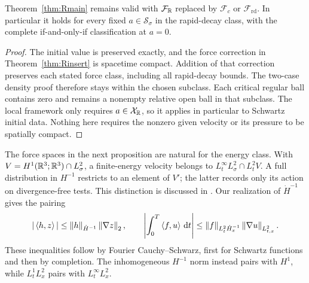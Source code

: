 \begin{corollary}\label{cor:Rclasses}
Theorem~\ref{thm:Rmain} remains valid with $\mathcal F_{\mathbb R}$ replaced by $\mathcal F_c$ or $\mathcal F_{\mathrm{rd}}$. In particular it holds for every fixed $a\in\mathcal S_\sigma$ in the rapid-decay class, with the complete if-and-only-if classification at $a=0$.
\end{corollary}
\begin{proof}
The initial value is preserved exactly, and the force correction in Theorem~\ref{thm:Rinsert} is spacetime compact. Addition of that correction preserves each stated force class, including all rapid-decay bounds. The two-case density proof therefore stays within the chosen subclass. Each critical regular ball contains zero and remains a nonempty relative open ball in that subclass. The local framework only requires $a\in\mathcal X_{\mathbb R}$, so it applies in particular to Schwartz initial data. Nothing here requires the nonzero given velocity or its pressure to be spatially compact.
\end{proof}

The force spaces in the next proposition are natural for the energy
class. With $V=H^1(\mathbb R^3;\mathbb R^3)\cap L^2_\sigma$, a finite-energy velocity
belongs to $L^\infty_tL^2_\sigma\cap L^2_tV$. A full distribution in
$H^{-1}$ restricts to an element of $V'$; the latter records only its
action on divergence-free tests. This distinction is discussed in
\cite[Definition~1 and Remark~4]{berselli}. Our realization of
$\dot H^{-1}$ gives the pairing
\[
 |\left\langle h,z\right\rangle|\le\left\lVert h\right\rVert_{\dot H^{-1}}\left\lVert\nabla z\right\rVert_2,
 \qquad
 \left|\int_0^T\left\langle f,u\right\rangle\,\mathrm d t\right|
 \le\left\lVert f\right\rVert_{L^2_t\dot H^{-1}_x}\left\lVert\nabla u\right\rVert_{L^2_{t,x}}.
\]
These inequalities follow by Fourier Cauchy--Schwarz, first for Schwartz
functions and then by completion. The inhomogeneous $H^{-1}$ norm instead
pairs with $H^1$, while $L^1_tL^2_x$ pairs with $L^\infty_tL^2_x$.


